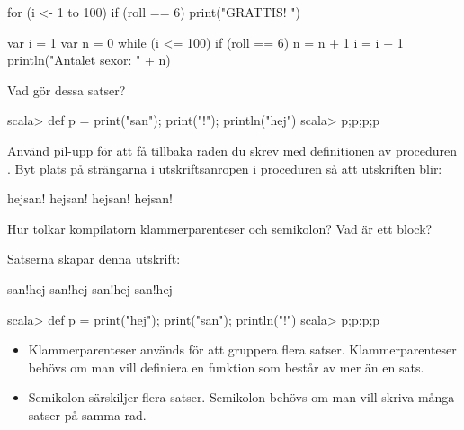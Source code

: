 \SOLUTION

\TaskSolved \what

\SubtaskSolved
\begin{Code}
for (i <- 1 to 100) if (roll == 6) print("GRATTIS! ")
\end{Code}

\SubtaskSolved
\begin{Code}
var i = 1
var n = 0
while (i <= 100) {
  if (roll == 6) n = n + 1
  i = i + 1
}
println("Antalet sexor: " + n)
\end{Code}


\QUESTEND




\QUESTBEGIN

\Task \what

\Subtask Vad gör dessa satser?
\begin{REPLnonum}
scala> def p = { print("san"); print("!"); println("hej")}
scala> p;p;p;p
\end{REPLnonum}

\Subtask
Använd pil-upp för att få tillbaka raden du skrev med definitionen av proceduren . Byt plats på strängarna i utskriftsanropen i proceduren  så att utskriften blir:
\begin{REPLnonum}
hejsan!
hejsan!
hejsan!
hejsan!
\end{REPLnonum}

\Subtask Hur tolkar kompilatorn klammerparenteser och semikolon? Vad är ett block?

\SOLUTION

\TaskSolved \what

\SubtaskSolved
Satserna skapar denna utskrift:
\begin{REPLnonum}
san!hej
san!hej
san!hej
san!hej
\end{REPLnonum}

\SubtaskSolved
\begin{REPLnonum}
scala> def p = { print("hej"); print("san"); println("!")}
scala> p;p;p;p
\end{REPLnonum}

\SubtaskSolved
\begin{itemize}
\item Klammerparenteser används för att gruppera flera satser. Klammerparenteser behövs om man vill definiera en funktion som består av mer än en sats.

\item Semikolon särskiljer flera satser. Semikolon behövs om man vill skriva många satser på samma rad.


\end{itemize}


